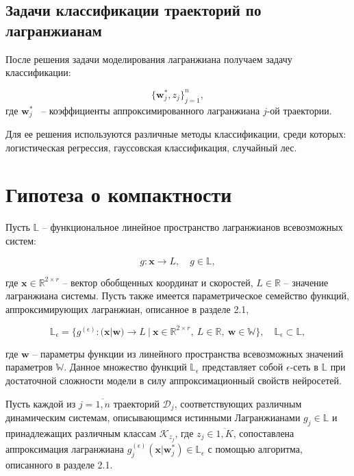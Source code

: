 \documentclass[12pt, twoside]{article}
\begin{document}
    \subsection{Задачи классификации траекторий по лагранжианам}

        После решения задачи моделирования лагранжиана получаем задачу классификации:

        $$\{\textbf{w}^*_j, z_j\}_{j=1}^n,$$
        где $\textbf{w}^*_j$ ~-- коэффициенты аппроксимированного лагранжиана $j$-ой траектории.
    
        Для ее решения используются различные методы классификации, среди которых: логистическая регрессия, гауссовская классификация, случайный лес.

\section{Гипотеза о компактности}




Пусть $\mathbb{L}$ -- функциональное линейное пространство лагранжианов всевозможных систем:

$$g: \mathbf{x} \to L, \quad g \in \mathbb{L},$$ 

\noindent
где $\mathbf{x} \in \mathbb{R}^{2 \times r}$ -- вектор обобщенных координат и скоростей, $L \in \mathbb{R}$ -- значение лагранжиана системы. Пусть также имеется  параметрическое семейство функций, аппроксимирующих лагранжиан, описанное в разделе 2.1,

$$\mathbb{L}_{\epsilon} = \{ g^{(\epsilon)} \colon (\mathbf{x} | \mathbf{w}) \to L \ | \ \mathbf{x} \in \mathbb{R}^{2 \times r}, \  L \in \mathbb{R},  
   \  \mathbf{w} \in \mathbb{W} \}, \quad \mathbb{L}_{\epsilon} \subset \mathbb{L},$$

\noindent
где $\mathbf{w}$ -- параметры функции из линейного пространства всевозможных значений параметров $\mathbb{W}$. Данное множество функций $\mathbb{L}_{\epsilon}$ представляет собой $\epsilon$-сеть в $\mathbb{L}$ при достаточной сложности модели в силу аппроксимационный свойств нейросетей.

Пусть каждой из $j = \overline{1, n}$ траекторий $\mathcal{D}_j$, соответствующих различным динамическим системам, описывающимся истинными Лагранжианами $g_j \in \mathbb{L}$ и принадлежащих различным классам $\mathcal{K}_{z_j}$, где $z_j \in \overline{1, K}$, сопоставлена аппроксимация лагранжиана $g_j^{(\epsilon)}(\mathbf{x}|\mathbf{w}_j^*) \in \mathbb{L}_{\epsilon}$ с помощью алгоритма, описанного в разделе 2.1. 
\newline
\end{document}
